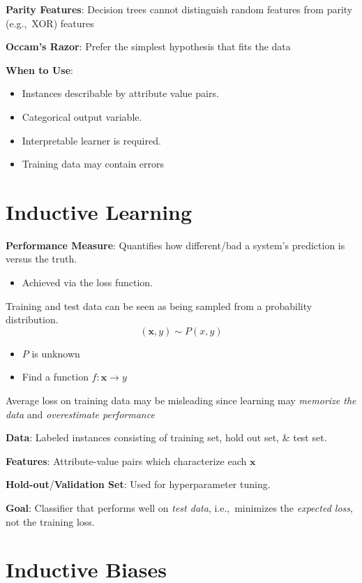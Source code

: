 \documentclass[10pt]{article}
\begin{document}
\begin{multicols}{3}
  \textbf{Parity Features}: Decision trees cannot distinguish random features from parity (e.g.,~XOR) features

  \textbf{Occam's Razor}: Prefer the simplest hypothesis that fits the data

  \textbf{When to Use}:
  \begin{itemize}
    \item Instances describable by attribute value pairs.
    \item Categorical output variable.
    \item Interpretable learner is required.
    \item Training data may contain errors
  \end{itemize}

  \section{Inductive Learning}

  \textbf{Performance Measure}: Quantifies how different/bad a system's prediction is versus the truth.
  \begin{itemize}
    \item Achieved via the loss function.
  \end{itemize}

  Training and test data can be seen as being sampled from a probability distribution.
  \[(\mathbf{x},y)\sim P(x,y)\]
  \begin{itemize}
    \item $P$ is unknown
    \item Find a function $f:\mathbf{x} \rightarrow y$
  \end{itemize}

  Average loss on training data may be misleading since learning may \textit{memorize the data} and \textit{overestimate performance}

  \textbf{Data}: Labeled instances consisting of training set, hold out set, \& test set.

  \textbf{Features}: Attribute-value pairs which characterize each $\mathbf{x}$

  \textbf{Hold-out}/\textbf{Validation Set}: Used for hyperparameter tuning.

  \textbf{Goal}: Classifier that performs well on \textit{test data}, i.e.,~minimizes the \textit{expected loss}, not the training loss.

  \section*{Inductive Biases}


\end{multicols}
\end{document}
